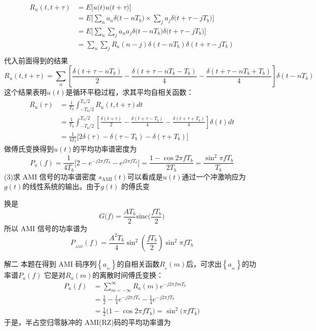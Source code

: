 \documentclass[utf8]{article}
\begin{document}
$$\begin{aligned}R_{u}\left(t,t+\tau\right)&=E\bigg[u\big(t\big)u\big(t+\tau\big)\bigg]\\&=E\bigg[\sum_{n}a_{n}\delta\big(t-nT_{b}\big)\times\sum_{j}a_{j}\delta\big(t+\tau-jT_{b}\big)\bigg]\\&=E\bigg[\sum_{n}\sum_{j}a_{n}a_{j}\delta\big(t-nT_{b}\big)\delta\big(t+\tau-jT_{b}\big)\bigg]\\&=\sum_{n}\sum_{j}R_{a}\left(n-j\right)\delta\left(t-nT_{b}\right)\delta\left(t+\tau-jT_{b}\right)\\\end{aligned}$$
代入前面得到的结果
$$R_{u}\left(t,t+\tau\right)=\sum_{n}\left[\frac{\delta\left(t+\tau-nT_{b}\right)}{2}-\frac{\delta\left(t+\tau-nT_{b}-T_{b}\right)}{4}-\frac{\delta\left(t+\tau-nT_{b}+T_{b}\right)}{4}\right]\delta\left(t-nT_{b}\right)$$
这个结果表明$u(t)$是循环平稳过程，求其平均自相关函数：
$$\begin{aligned}\overline{R_{u}}\left(\tau\right)&=\frac{1}{T_{b}}\int_{-T_{b}/2}^{T_{b}/2}R_{u}\left(t,t+\tau\right)dt\\&=\frac{1}{T_{b}}\int_{-T_{b}/2}^{T_{b}/2}\left[\frac{\delta\left(t+\tau\right)}{2}-\frac{\delta\left(t+\tau-T_{b}\right)}{4}-\frac{\delta\left(t+\tau+T_{b}\right)}{4}\right]\delta\left(t\right)dt\\&=\frac{1}{4T_{b}}\Big[2\delta\left(\tau\right)-\delta\left(\tau-T_{b}\right)-\delta\left(\tau+T_{b}\right)\Big]\end{aligned}$$
做傅氏变换得到$u(t)$的平均功率谱密度为
$$P_u\left(f\right)=\frac{1}{4T_b}\Big[2-e^{-j2\pi fT_b}-e^{j2\pi fT_b}\Big]=\frac{1-\cos2\pi fT_b}{2T_b}=\frac{\sin^2\pi fT_b}{T_b}$$
(3)求 AMI 信号的功率谱密度
$s_\text{AMI}{(t)}$可以看成是$u(t)$通过一个冲激响应为$g(t)$的线性系统的输出。由于$g(t)$ 的傅氏变

换是
$$G\big(f\big)=\frac{AT_b}{2}\text{sinc}\bigg(\frac{fT_b}{2}\bigg)$$
所以 AMI 信号的功率谱为
$$P_{_{AMI}}\left(f\right)=\frac{A^2T_b}{4}\sin^2\left(\frac{fT_b}{2}\right)\sin^2\pi fT_b$$

解二 本题在得到 AMI 码序列$\left\{a_{_m}\right\}$的自相关函数$R_{_a}\left(m\right)$后，可求出$\left\{a_{_m}\right\}$的功率谱$P_a\left(f\right)$
它是对$R_a(m)$的离散时间傅氏变换：
$$\begin{aligned}P_{a}\left(f\right)&=\sum_{m=-\infty}^{\infty}R_{a}\left(m\right)e^{-j2\pi fmT_{b}}\\&=\frac{1}{2}-\frac{1}{4}e^{-j2\pi fT_{b}}-\frac{1}{4}e^{-j2\pi fT_{b}}\\&=\frac{1}{2}\big(1-\cos2\pi fT_{b}\big)=\sin^{2}\big(\pi fT_{b}\big)\end{aligned}$$
于是，半占空归零脉冲的 AMI(RZ)码的平均功率谱为
\end{document}
